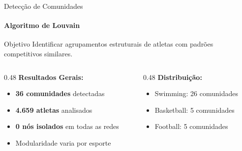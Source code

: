 \begin{frame}{Detecção de Comunidades}
    \framesubtitle{Algoritmo de Louvain}
    \begin{block}{Objetivo}
        Identificar agrupamentos estruturais de atletas com padrões competitivos similares.
    \end{block}

    \begin{columns}[T]
        \begin{column}{0.48\textwidth}
            \textbf{Resultados Gerais:}
            \begin{itemize}
                \item \textbf{36 comunidades} detectadas
                \item \textbf{4.659 atletas} analisados
                \item \textbf{0 nós isolados} em todas as redes
                \item Modularidade varia por esporte
            \end{itemize}
        \end{column}
        \begin{column}{0.48\textwidth}
            \textbf{Distribuição:}
            \begin{itemize}
                \item Swimming: 26 comunidades
                \item Basketball: 5 comunidades
                \item Football: 5 comunidades
            \end{itemize}
        \end{column}
    \end{columns}
\end{frame}

